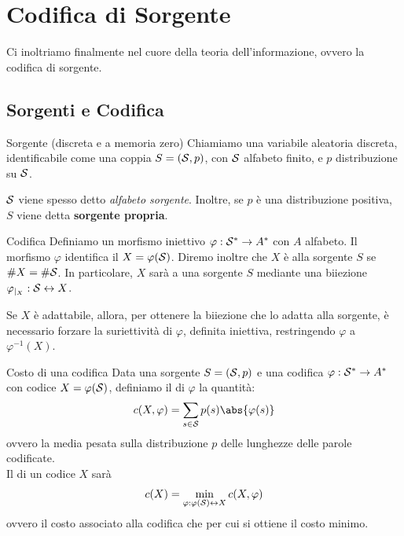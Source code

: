 \chapter{Codifica di Sorgente}

Ci inoltriamo finalmente nel cuore della teoria dell'informazione, ovvero la codifica di sorgente.

\section{Sorgenti e Codifica}

\begin{definition}{Sorgente (discreta e a memoria zero)}
  Chiamiamo  una variabile aleatoria discreta, identificabile come una coppia \(S = (\mathcal{S},p)\), con \(\mathcal{S}\) alfabeto finito, e \(p\) distribuzione su \(\mathcal{S}\).
\end{definition}
$\mathcal{S}$ viene spesso detto \textit{alfabeto sorgente}. Inoltre, se \(p\) è una distribuzione positiva, \(S\) viene detta \textbf{sorgente propria}.

\begin{definition}{Codifica}
  Definiamo  un morfismo iniettivo \(\varphi: \mathcal{S}^* \to A^*\) con \(A\) alfabeto. Il morfismo $\varphi$ identifica il  $X=\varphi(\mathcal{S})$.
  Diremo inoltre che $X$ è  alla sorgente \(S\) se \(\# X = \# \mathcal{S}\).
  In particolare, $X$ sarà  a una sorgente \(S\) mediante una biiezione \(\varphi_{|_X}: \mathcal{S} \leftrightarrow X\).
\end{definition}
Se $X$ è adattabile, allora, per ottenere la biiezione che lo adatta alla sorgente, è necessario forzare la suriettività di $\varphi$, definita iniettiva, restringendo $\varphi$ a $\varphi^{-1}(X)$.

\begin{definition}{Costo di una codifica}
  Data una sorgente \(S = (\mathcal{S},p)\) e una codifica \(\varphi: \mathcal{S}^* \to A^*\) con codice \(X = \varphi(\mathcal{S})\), definiamo il  di \(\varphi\) la quantità:
  \[c(X,\varphi) = \sum_{s \in \SCal} p(s) \abs{\varphi(s)}\]
  ovvero la media pesata sulla distribuzione \(p\) delle lunghezze delle parole codificate.\\
  Il  di un codice \(X\) sarà
  \[c(X) = \min_{\varphi: \varphi(\mathcal{S}) \leftrightarrow  X} c(X,\varphi)\] ovvero il costo associato alla codifica che per cui si ottiene il costo minimo.
\end{definition}

